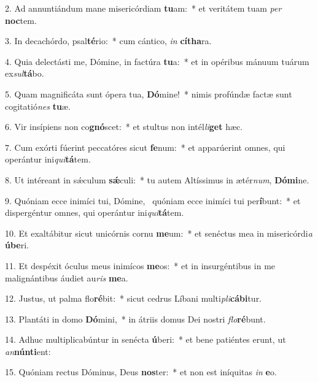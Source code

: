 2. Ad annuntiándum mane misericórdiam \textbf{tu}am:~*  et veritátem tuam \textit{per} \textbf{noc}tem.\

3. In decachórdo, psal\textbf{té}rio:~*  cum cántico, \textit{in} \textbf{cí}\textbf{tha}ra.\

4. Quia delectásti me, Dómine, in factúra \textbf{tu}a:~*  et in opéribus mánuum tuárum ex\textit{sul}\textbf{tá}bo.\

5. Quam magnificáta sunt ópera tua, \textbf{Dó}mine!~*  nimis profúndæ factæ sunt cogitatió\textit{nes} \textbf{tu}æ.\

6. Vir insípiens non co\textbf{gnó}scet:~*  et stultus non intél\textit{li}\textbf{get} hæc.\

7. Cum exórti fúerint peccatóres sicut \textbf{fe}num:~*  et apparúerint omnes, qui operántur ini\textit{qui}\textbf{tá}tem.\

8. Ut intéreant in sǽculum \textbf{sǽ}culi:~*  tu autem Altíssimus in ætér\textit{num}, \textbf{Dó}\textbf{mi}ne.\

9. Quóniam ecce inimíci tui, Dómine, \dag\  quóniam ecce inimíci tui per\textbf{í}bunt:~*  et dispergéntur omnes, qui operántur ini\textit{qui}\textbf{tá}tem.\

10. Et exaltábitur sicut unicórnis cornu \textbf{me}um:~*  et senéctus mea in misericórdi\textit{a} \textbf{ú}\textbf{be}ri.\

11. Et despéxit óculus meus inimícos \textbf{me}os:~*  et in insurgéntibus in me malignántibus áudiet au\textit{ris} \textbf{me}a.\

12. Justus, ut palma flo\textbf{ré}bit:~*  sicut cedrus Líbani multi\textit{pli}\textbf{cá}\textbf{bi}tur.\

13. Plantáti in domo \textbf{Dó}mini,~*  in átriis domus Dei nostri \textit{flo}\textbf{ré}bunt.\

14. Adhuc multiplicabúntur in senécta \textbf{ú}beri:~*  et bene patiéntes erunt, ut \textit{an}\textbf{nún}\textbf{ti}ent:\

15. Quóniam rectus Dóminus, Deus \textbf{nos}ter:~*  et non est iníquitas \textit{in} \textbf{e}o.\

